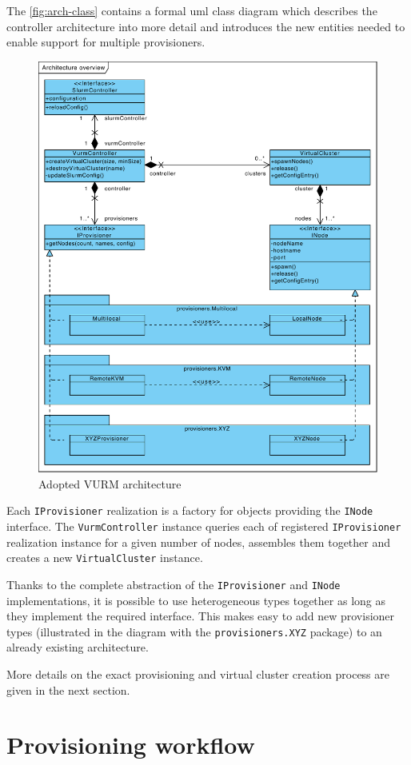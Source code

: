 The \autoref{fig:arch-class} contains a formal \gls{uml} class diagram which describes the controller architecture into more detail and introduces the new entities needed to enable support for multiple provisioners.

\begin{figure}[ht]
	\centering
	\includegraphics[width=.7\textwidth]{figures/arch-class}
	\caption{Adopted VURM architecture}
	\label{fig:arch-class}
\end{figure}

Each \texttt{IProvisioner} realization is a factory for objects providing the \texttt{INode} interface. The \texttt{VurmController} instance queries each of registered \texttt{IProvisioner} realization instance for a given number of nodes, assembles them together and creates a new \texttt{VirtualCluster} instance.

Thanks to the complete abstraction of the \texttt{IProvisioner} and \texttt{INode} implementations, it is possible to use heterogeneous types together as long as they implement the required interface. This makes easy to add new provisioner types (illustrated in the diagram with the \texttt{provisioners.XYZ} package) to an already existing architecture.

More details on the exact provisioning and virtual cluster creation process are given in the next section.

\section{Provisioning workflow}
\label{sec:vc-creation}

